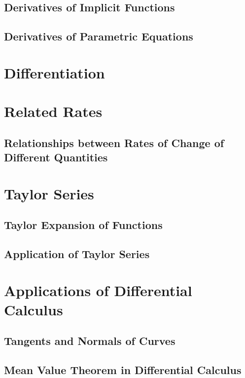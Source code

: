         \subsection{Derivatives of Implicit Functions}
        \subsection{Derivatives of Parametric Equations}

    \section{Differentiation}
    
    \section{Related Rates}
        \subsection{Relationships between Rates of Change of Different Quantities}

    \section{Taylor Series}
        \subsection{Taylor Expansion of Functions}
        \subsection{Application of Taylor Series}
    

    \section{Applications of Differential Calculus}
        \subsection{Tangents and Normals of Curves}
        \subsection{Mean Value Theorem in Differential Calculus}
